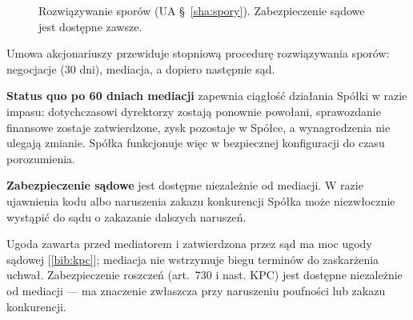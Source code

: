 \documentclass[11pt,a4paper]{report}
\newcommand{\Zr}[1]{[\ref{bib:#1}]}
\begin{document}
\begin{figure}[H]
\centering
{}
\caption{Rozwiązywanie sporów (UA §~\ref{sha:spory}). Zabezpieczenie sądowe jest dostępne zawsze.}
\end{figure}

\begin{OCoChodzi}
Umowa akcjonariuszy przewiduje stopniową procedurę rozwiązywania sporów: negocjacje (30 dni), mediacja, a dopiero następnie sąd.

\textbf{Status quo po 60 dniach mediacji} zapewnia ciągłość działania Spółki w razie impasu: dotychczasowi dyrektorzy zostają ponownie powołani, sprawozdanie finansowe zostaje zatwierdzone, zysk pozostaje w Spółce, a wynagrodzenia nie ulegają zmianie. Spółka funkcjonuje więc w bezpiecznej konfiguracji do czasu porozumienia.

\textbf{Zabezpieczenie sądowe} jest dostępne niezależnie od mediacji. W razie ujawnienia kodu albo naruszenia zakazu konkurencji Spółka może niezwłocznie wystąpić do sądu o zakazanie dalszych naruszeń.
\end{OCoChodzi}

\begin{Komentarz}
Ugoda zawarta przed mediatorem i zatwierdzona przez sąd ma moc ugody sądowej \Zr{kpc}; mediacja nie wstrzymuje biegu terminów do zaskarżenia uchwał. Zabezpieczenie roszczeń (art.~730 i nast. KPC) jest dostępne niezależnie od mediacji --- ma znaczenie zwłaszcza przy naruszeniu poufności lub zakazu konkurencji.
\end{Komentarz}
\end{document}
